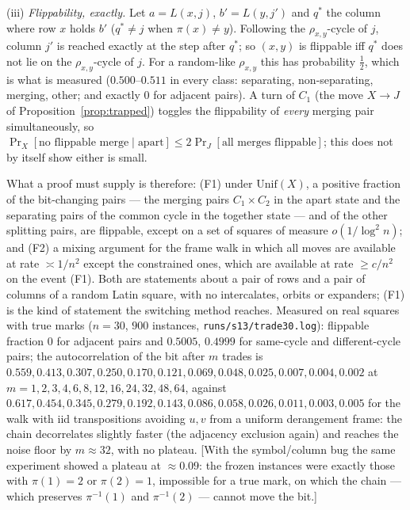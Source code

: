 (iii) \emph{Flippability, exactly.}  Let $a=L(x,j)$, $b'=L(y,j')$ and
$q^*$ the column where row $x$ holds $b'$ ($q^*\ne j$ when
$\pi(x)\ne y$).  Following the $\rho_{x,y}$-cycle of $j$, column $j'$
is reached exactly at the step after $q^*$; so $(x,y)$ is flippable iff
$q^*$ does not lie on the $\rho_{x,y}$-cycle of $j$.  For a random-like
$\rho_{x,y}$ this has probability $\tfrac12$, which is what is measured
($0.500$--$0.511$ in every class: separating, non-separating, merging,
other; and exactly $0$ for adjacent pairs).  A turn of $C_1$ (the move
$X\to J$ of Proposition~\ref{prop:trapped}) toggles the flippability
of \emph{every} merging pair simultaneously, so
$\Pr_X[\text{no flippable merge}\mid\text{apart}]\le2\Pr_J[\text{all merges flippable}]$;
this does not by itself show either is small.

What a proof must supply is therefore: (F1) under $\mathrm{Unif}(X)$,
a positive fraction of the bit-changing pairs --- the merging pairs
$C_1\times C_2$ in the apart state and the separating pairs of the
common cycle in the together state --- and of the other splitting
pairs, are flippable, except on a set of squares of measure
$o(1/\log^2n)$; and
(F2) a mixing argument for the frame walk in which all moves are
available at rate $\asymp1/n^2$ except the constrained ones, which are
available at rate $\ge c/n^2$ on the event (F1).  Both are statements
about a pair of rows and a pair of columns of a random Latin square,
with no intercalates, orbits or expanders; (F1) is the kind of
statement the switching method reaches.  Measured on real squares
with true marks ($n=30$, $900$ instances, \texttt{runs/s13/trade30.log}):
flippable fraction $0$ for adjacent pairs and $0.5005$, $0.4999$ for
same-cycle and different-cycle pairs; the autocorrelation of the bit
after $m$ trades is $0.559,0.413,0.307,0.250,0.170,0.121,0.069,0.048,
0.025,0.007,0.004,0.002$ at $m=1,2,3,4,6,8,12,16,24,32,48,64$, against
$0.617,0.454,0.345,0.279,0.192,0.143,0.086,0.058,0.026,0.011,0.003,0.005$
for the walk with iid transpositions avoiding $u,v$ from a uniform
derangement frame: the chain decorrelates slightly faster (the
adjacency exclusion again) and reaches the noise floor by $m\approx32$,
with no plateau.  [With the symbol/column bug the same experiment
showed a plateau at $\approx0.09$: the frozen instances were exactly
those with $\pi(1)=2$ or $\pi(2)=1$, impossible for a true mark, on
which the chain --- which preserves $\pi^{-1}(1)$ and $\pi^{-1}(2)$
--- cannot move the bit.]

